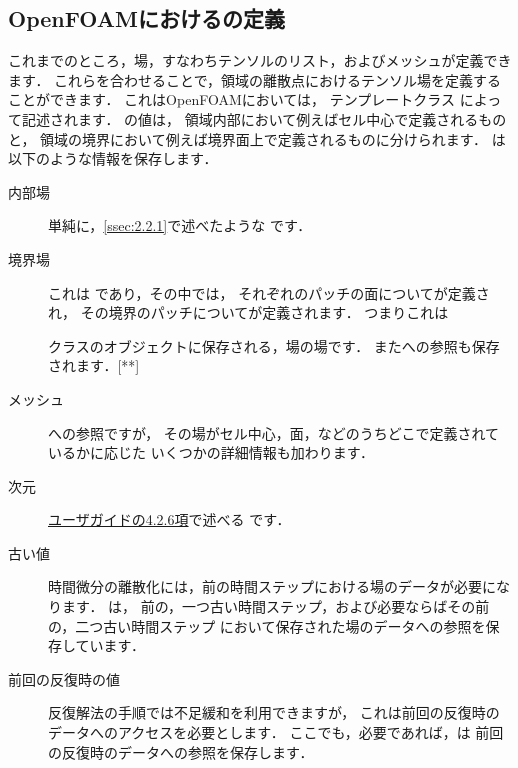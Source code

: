 \subsection{OpenFOAMにおけるの定義}
\label{ssec:2.3.2}
これまでのところ，場，すなわちテンソルのリスト，およびメッシュが定義できます．
これらを合わせることで，領域の離散点におけるテンソル場を定義することができます．
これはOpenFOAMにおいては，
%  
%  
テンプレートクラス
によって記述されます．
の値は，
領域内部において例えばセル中心で定義されるものと，
領域の境界において例えば境界面上で定義されるものに分けられます．
は以下のような情報を保存します．
\begin{description}
 \item[内部場] 単純に，\autoref{ssec:2.2.1}で述べたような
            です．
 \item[境界場] これは
% 
%  
であり，その中では，
            それぞれのパッチの面についてが定義され，
            その境界のパッチについてが定義されます．
            つまりこれは

クラスのオブジェクトに保存される，場の場です．
            またへの参照も保存されます．[**]
 \item[メッシュ] への参照ですが，
            その場がセル中心，面，などのうちどこで定義されているかに応じた
            いくつかの詳細情報も加わります．
 \item[次元] \href{UserGuideJa.pdf#subsection.4.2.6}{ユーザガイドの4.2.6項}で述べる
%   
%             
です．
 \item[古い値] 時間微分の離散化には，前の時間ステップにおける場のデータが必要になります．
%  
            は，
            前の，一つ古い時間ステップ，および必要ならばその前の，二つ古い時間ステップ
            において保存された場のデータへの参照を保存しています．
 \item[前回の反復時の値] 反復解法の手順では不足緩和を利用できますが，
            これは前回の反復時のデータへのアクセスを必要とします．
            ここでも，必要であれば，は
            前回の反復時のデータへの参照を保存します．
\end{description}
